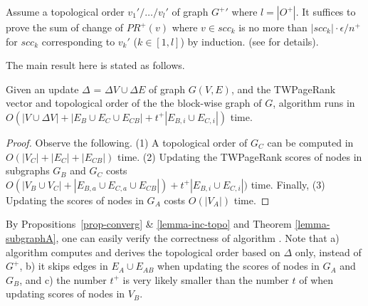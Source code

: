 \begin{proofSketch}
Assume a topological order $v_1'/\dots/v_{l}'$ of graph $G^+{'}$ where $l=|O^+|$. It suffices to prove the sum of change of $PR^+(v)$ where $v\in scc_k$ is no more than $|scc_k|\cdot\epsilon/n^+$ for $scc_k$ corresponding to $v_k'$ ($k\in [1,l]$) by induction.
(see \cite{SARank-full} for details).
\end{proofSketch}


The main result here is stated as follows.


\begin{prop} \label{lemma-inc-citation-comp}
Given an update $\Delta$ = $\Delta V\cup\Delta E$ of graph $G(V,E)$, and the TWPageRank vector and topological order of the  the
block-wise graph of $G$, algorithm \inctwprscc runs in $O(|V\cup \Delta V|+|E_B\cup E_C\cup E_{CB}|+t^+|E_{B,i}\cup E_{C,i}|)$ time.
\end{prop}

\begin{proof}
Observe the following. (1) A topological order of $G_C$ can be computed in $O(|V_C|+|E_C|+|E_{CB}|)$ time.
(2) Updating the TWPageRank scores of nodes in subgraphs $G_B$ and $G_C$ costs $O(|V_B\cup V_C|+|E_{B,a}\cup E_{C,a}\cup E_{CB}|)+t^+|E_{B,i}\cup E_{C,i}|)$ time. Finally, (3) Updating the scores of nodes in $G_A$ costs $O(|V_A|)$ time.
\end{proof}


By Propositions~\ref{prop-converg} \& \ref{lemma-inc-topo} and Theorem \ref{lemma-subgraphA}, one can easily verify the correctness of algorithm \inctwprscc.
%
Note that  a) algorithm \inctwprscc computes \sccs and derives the topological order based  on $\Delta$ only, instead of $G^{+}$,
b) it skips edges in $E_A\cup E_{AB}$ when updating the scores of nodes in $G_A$ and $G_B$, and 
c) the number $t^+$ is very likely smaller than the number $t$ of \twprscc when updating scores of nodes in $V_B$.
%

